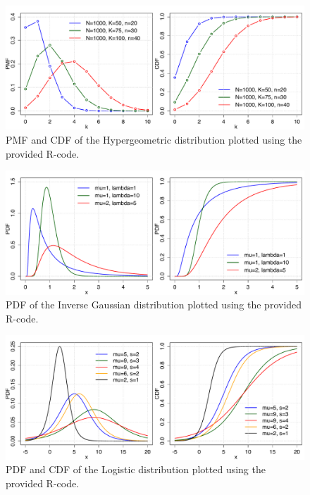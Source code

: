 \begin{figure}[htb!]
\centering
  \includegraphics[width=140mm]{pics/Hypergeometric_pmf_cdf.pdf}
 \caption{PMF and CDF of the Hypergeometric distribution plotted using the provided R-code.}
 \label{fig:Hypergeometric_pmf_cdf}
\end{figure}

\begin{figure}[htb!]
\centering
  \includegraphics[width=140mm]{pics/InverseGaussian_pdf_cdf.pdf}
 \caption{PDF of the Inverse Gaussian distribution plotted using the provided R-code.}
 \label{fig:InverseGaussian_pdf_cdf}
\end{figure}

\begin{figure}[htb!]
\centering
  \includegraphics[width=140mm]{pics/Logistic_pdf_cdf.pdf}
 \caption{PDF and CDF of the Logistic distribution plotted using the provided R-code.}
 \label{fig:Logistic_pdf_cdf}
\end{figure}

